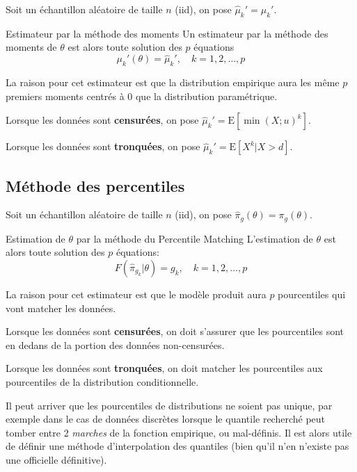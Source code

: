\documentclass[10pt, french]{article}
\begin{document}
\begin{multicols*}{3}
Soit un échantillon aléatoire de taille $n$ (iid), on pose $\hat\mu_{k}' = \mu_{k}'$.

\begin{algo}{Estimateur par la méthode des moments}
Un estimateur par la méthode des moments de $\theta$ est alors toute solution des $p$ équations
\begin{equation*}
	\mu_{k}'(\theta) = \hat\mu_{k}', \quad	k = 1, 2, \dots, p
\end{equation*}
\end{algo}

La raison pour cet estimateur est que la distribution empirique aura les même $p$ premiers moments centrés à 0 que la distribution paramétrique.
 

Lorsque les données sont \textbf{censurées}, on pose $\hat\mu_{k}' = \text{E}[\min(X; u)^{k}]$.

Lorsque les données sont \textbf{tronquées}, on pose $\hat\mu_{k}' = \text{E}[X^{k} | X > d]$.


\subsection*{Méthode des percentiles}


Soit un échantillon aléatoire de taille $n$ (iid), on pose $\hat\pi_{g}(\theta) = \pi_{g}(\theta)$.

\begin{algo}{Estimation de $\theta$ par la méthode du \guillemotleft Percentile Matching \guillemotright}
L'estimation de $\theta$ est alors toute solution des $p$ équations:
\begin{equation*}
	F(\hat\pi_{g_{k}} | \theta)	=	g_{k}, \quad	k = 1, 2, \dots, p
\end{equation*}
\end{algo}

La raison pour cet estimateur est que le modèle produit aura $p$ pourcentiles qui vont \guillemotleft matcher \guillemotright les données.

Lorsque les données sont \textbf{censurées}, on doit s'assurer que les pourcentiles sont en dedans de la portion des données non-censurées.

Lorsque les données sont \textbf{tronquées}, on doit \guillemotleft matcher \guillemotright les pourcentiles aux pourcentiles de la distribution conditionnelle.

Il peut arriver que les pourcentiles de distributions ne soient pas unique, par exemple dans le cas de données discrètes lorsque le quantile recherché peut tomber entre 2 \emph{marches} de la fonction empirique, ou mal-définis.
Il est alors utile de définir une méthode d'interpolation des quantiles (bien qu'il n'en n'existe pas une officielle définitive).


\end{multicols*}
\end{document}
